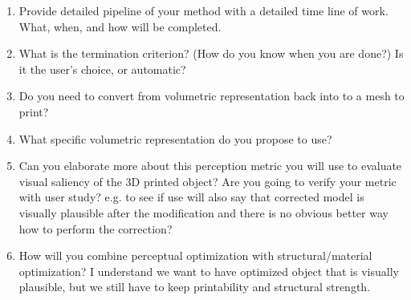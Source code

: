 \begin{enumerate}
  \item Provide detailed pipeline of your method with a detailed time line of work. What, when, and how will be completed.
	
	
	\item What is the termination criterion? (How do you know when you are done?) Is it the user's choice, or automatic?

  \item Do you need to convert from volumetric representation back into to a mesh to print?

  \item What specific volumetric representation do you propose to use?

	\item Can you elaborate more about this perception metric you will use to evaluate visual saliency of the 3D printed object? Are you going to verify your metric with user study? e.g. to see if use will also say that corrected model is visually plausible after the modification and there is no obvious better way how to perform the correction?
	
	\item How will you combine perceptual optimization with structural/material optimization? I understand we want to have optimized object that is visually plausible, but we still have to keep printability and structural strength.
	

\end{enumerate}
